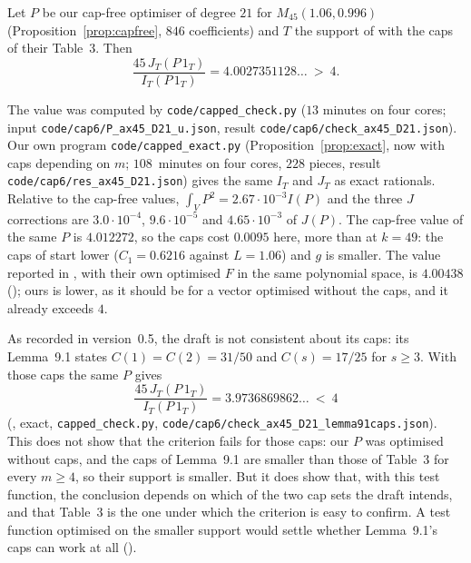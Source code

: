 \begin{proposition}\label{prop:cha-capped}
Let $P$ be our cap-free optimiser of degree $21$ for
$M_{45}(1.06,0.996)$ (Proposition~\ref{prop:capfree}, $846$ coefficients) and
$T$ the support of \cite{Cha26} with the caps of their Table~3. Then
\[
\frac{45\,J_T(P\,1_T)}{I_T(P\,1_T)}=4.0027351128\ldots\ >\ 4 .
\]
\end{proposition}

\begin{sloppypar}
The value was computed by \texttt{code/capped\_check.py} ($13$ minutes on four
cores; input \texttt{code/cap6/P\_ax45\_D21\_u.json}, result
\texttt{code/cap6/check\_ax45\_D21.json}). Our own program \texttt{code/capped\_exact.py}
(Proposition~\ref{prop:exact}, now with caps depending on $m$; $108$~minutes
on four cores, $228$ pieces, result \texttt{code/cap6/res\_ax45\_D21.json})
gives the same $I_T$ and $J_T$ as exact rationals. Relative to the cap-free
values, $\int_VP^2=2.67\cdot10^{-3}I(P)$ and the three $J$ corrections are
$3.0\cdot10^{-4}$, $9.6\cdot10^{-5}$ and $4.65\cdot10^{-3}$ of $J(P)$. The cap-free value of the
same $P$ is $4.012272$, so the caps cost $0.0095$ here, more than at $k=49$:
the caps of \cite{Cha26} start lower ($C_1=0.6216$ against $L=1.06$) and
$g$ is smaller. The value reported in \cite[Thm.~11.1]{Cha26}, with their own
optimised $F$ in the same polynomial space, is $4.00438$ ();
ours is lower, as it should be for a vector optimised without the caps, and
it already exceeds $4$.
\end{sloppypar}

As recorded in version~0.5, the draft \cite{Cha26} is not consistent about
its caps: its Lemma~9.1 states $C(1)=C(2)=31/50$ and $C(s)=17/25$ for
$s\ge3$. With those caps the same $P$ gives
\[
\frac{45\,J_T(P\,1_T)}{I_T(P\,1_T)}=3.9736869862\ldots\ <\ 4
\]
(, exact, \texttt{capped\_check.py},
\texttt{code/cap6/check\_ax45\_D21\_lemma91caps.json}).
This does not show that the criterion fails for those caps: our $P$
was optimised without caps, and the caps of Lemma~9.1 are smaller than those
of Table~3 for every $m\ge4$, so their support is smaller. But it does show
that, with this test function, the conclusion depends on which of the two
cap sets the draft intends, and that Table~3 is the one under which the
criterion is easy to confirm. A test function optimised on the smaller support
would settle whether Lemma~9.1's caps can work at all ().

